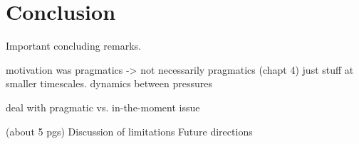 
\chapter{Conclusion}
\label{chapter:conclusion}
Important concluding remarks.

motivation was pragmatics -> not necessarily pragmatics (chapt 4) just stuff at smaller timescales.
dynamics between pressures

deal with pragmatic vs. in-the-moment issue

 (about 5 pgs)
Discussion of limitations
Future directions

